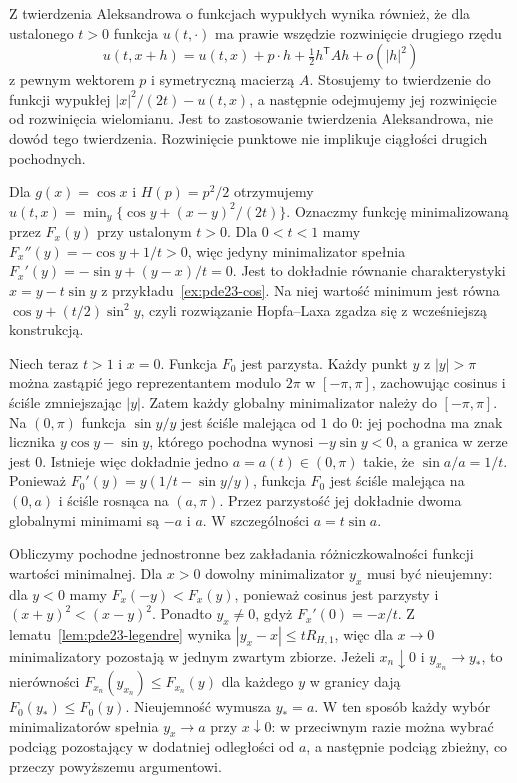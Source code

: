 \begin{uwaga}
Z twierdzenia Aleksandrowa o funkcjach wypukłych
wynika również, że dla ustalonego $t>0$
funkcja $u(t,\cdot)$ ma prawie wszędzie rozwinięcie
drugiego rzędu
\[
 u(t,x+h)=u(t,x)+p\cdot h+\tfrac12 h^{\mathsf T}Ah+o(|h|^2)
\]
z pewnym wektorem $p$ i symetryczną macierzą $A$.
Stosujemy to twierdzenie do funkcji wypukłej
$|x|^2/(2t)-u(t,x)$, a następnie odejmujemy
jej rozwinięcie od rozwinięcia wielomianu.
Jest to zastosowanie twierdzenia Aleksandrowa,
nie dowód tego twierdzenia. Rozwinięcie punktowe
nie implikuje ciągłości drugich pochodnych.
\end{uwaga}

\begin{przyklad}
\label{ex:pde23-shock}
Dla $g(x)=\cos x$ i $H(p)=p^2/2$ otrzymujemy
$u(t,x)=\min_y\{\cos y+(x-y)^2/(2t)\}$.
Oznaczmy funkcję minimalizowaną przez $F_x(y)$
przy ustalonym $t>0$.
Dla $0<t<1$ mamy
$F_x''(y)=-\cos y+1/t>0$,
więc jedyny minimalizator spełnia
$F_x'(y)=-\sin y+(y-x)/t=0$.
Jest to dokładnie równanie charakterystyki
$x=y-t\sin y$ z przykładu~\ref{ex:pde23-cos}.
Na niej wartość minimum jest równa
$\cos y+(t/2)\sin^2 y$, czyli rozwiązanie
Hopfa--Laxa zgadza się z wcześniejszą konstrukcją.

Niech teraz $t>1$ i $x=0$. Funkcja $F_0$ jest
parzysta. Każdy punkt $y$ z $|y|>\pi$ można
zastąpić jego reprezentantem modulo $2\pi$
w $[-\pi,\pi]$, zachowując cosinus i ściśle
zmniejszając $|y|$. Zatem każdy globalny
minimalizator należy do $[-\pi,\pi]$.
Na $(0,\pi)$ funkcja $\sin y/y$ jest ściśle
malejąca od $1$ do $0$: jej pochodna ma znak
licznika $y\cos y-\sin y$, którego pochodna
wynosi $-y\sin y<0$, a granica w zerze jest $0$.
Istnieje więc dokładnie jedno $a=a(t)\in(0,\pi)$
takie, że $\sin a/a=1/t$.
Ponieważ
$F_0'(y)=y(1/t-\sin y/y)$, funkcja $F_0$
jest ściśle malejąca na $(0,a)$ i ściśle
rosnąca na $(a,\pi)$. Przez parzystość
jej dokładnie dwoma globalnymi minimami
są $-a$ i $a$. W szczególności $a=t\sin a$.

Obliczymy pochodne jednostronne bez zakładania
różniczkowalności funkcji wartości minimalnej.
Dla $x>0$ dowolny minimalizator $y_x$
musi być nieujemny: dla $y<0$ mamy
$F_x(-y)<F_x(y)$, ponieważ cosinus jest
parzysty i $(x+y)^2<(x-y)^2$.
Ponadto $y_x\ne0$, gdyż $F_x'(0)=-x/t$.
Z lematu~\ref{lem:pde23-legendre} wynika
$|y_x-x|\le tR_{H,1}$, więc dla $x\to0$
minimalizatory pozostają w jednym zwartym zbiorze.
Jeżeli $x_n\downarrow0$ i $y_{x_n}\to y_*$,
to nierówności $F_{x_n}(y_{x_n})\le F_{x_n}(y)$
dla każdego $y$ w granicy dają
$F_0(y_*)\le F_0(y)$. Nieujemność wymusza
$y_*=a$. W ten sposób każdy wybór minimalizatorów
spełnia $y_x\to a$ przy $x\downarrow0$:
w przeciwnym razie można wybrać podciąg
pozostający w dodatniej odległości od $a$,
a następnie podciąg zbieżny, co przeczy
powyższemu argumentowi.


\end{przyklad}
